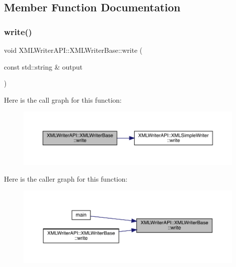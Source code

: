 \subsection{Member Function Documentation}
\mbox{\label{classXMLWriterAPI_1_1XMLWriterBase_abc9cd8491179aa022c9b63053f3a7ff8}} 
\subsubsection{\texorpdfstring{write()}{write()}\hspace{0.1cm}{\footnotesize\ttfamily [1/26]}}
{\footnotesize\ttfamily void X\+M\+L\+Writer\+A\+P\+I\+::\+X\+M\+L\+Writer\+Base\+::write (\begin{DoxyParamCaption}\item[{const std\+::string \&}]{output }\end{DoxyParamCaption})\hspace{0.3cm}{\ttfamily [inline]}}

Here is the call graph for this function\+:
\nopagebreak
\begin{figure}[H]
\begin{center}
\leavevmode
\includegraphics[width=350pt]{d5/df5/classXMLWriterAPI_1_1XMLWriterBase_abc9cd8491179aa022c9b63053f3a7ff8_cgraph}
\end{center}
\end{figure}
Here is the caller graph for this function\+:\nopagebreak
\begin{figure}[H]
\begin{center}
\leavevmode
\includegraphics[width=350pt]{d5/df5/classXMLWriterAPI_1_1XMLWriterBase_abc9cd8491179aa022c9b63053f3a7ff8_icgraph}
\end{center}
\end{figure}
\mbox{\label{classXMLWriterAPI_1_1XMLWriterBase_abc9cd8491179aa022c9b63053f3a7ff8}} 
